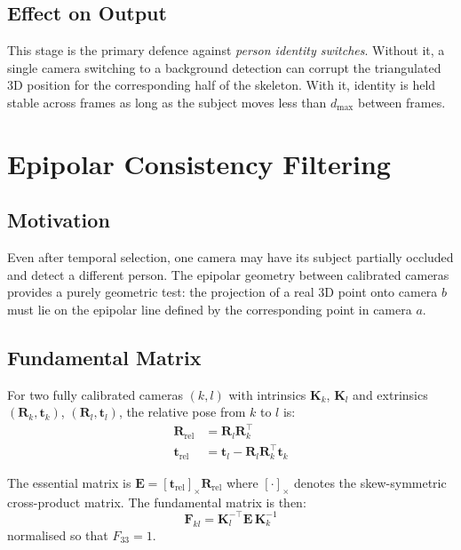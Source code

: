 \documentclass[11pt,a4paper]{article}
\begin{document}
\subsection{Effect on Output}

This stage is the primary defence against \emph{person identity switches}. Without it,
a single camera switching to a background detection can corrupt the triangulated 3D
position for the corresponding half of the skeleton. With it, identity is held stable
across frames as long as the subject moves less than $d_\text{max}$ between frames.

\section{Epipolar Consistency Filtering}

\subsection{Motivation}

Even after temporal selection, one camera may have its subject partially occluded and
detect a different person. The epipolar geometry between calibrated cameras provides a
purely geometric test: the projection of a real 3D point onto camera $b$ must lie on
the epipolar line defined by the corresponding point in camera $a$.

\subsection{Fundamental Matrix}

For two fully calibrated cameras $(k, l)$ with intrinsics $\mathbf{K}_k$,
$\mathbf{K}_l$ and extrinsics $(\mathbf{R}_k, \mathbf{t}_k)$,
$(\mathbf{R}_l, \mathbf{t}_l)$, the relative pose from $k$ to $l$ is:
\begin{align}
  \mathbf{R}_\text{rel} &= \mathbf{R}_l \mathbf{R}_k^\top \\
  \mathbf{t}_\text{rel} &= \mathbf{t}_l - \mathbf{R}_l \mathbf{R}_k^\top \mathbf{t}_k
\end{align}

The essential matrix is $\mathbf{E} = [\mathbf{t}_\text{rel}]_\times \mathbf{R}_\text{rel}$
where $[\cdot]_\times$ denotes the skew-symmetric cross-product matrix. The fundamental
matrix is then:
\begin{equation}
  \mathbf{F}_{kl} = \mathbf{K}_l^{-\top} \mathbf{E}\, \mathbf{K}_k^{-1}
  \label{eq:fundamental}
\end{equation}
normalised so that $F_{33} = 1$.
\end{document}
